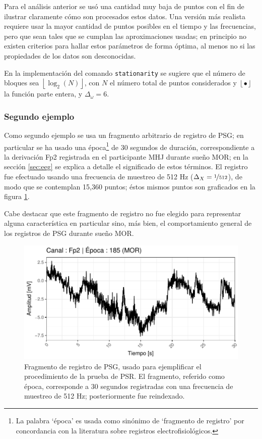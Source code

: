 \documentclass[12pt,letterpaper]{book}
\newcommand{\entero}[1]{\left\lfloor #1 \right\rfloor}
\begin{document}
Para el análisis anterior se usó una cantidad muy baja de puntos con el fin de ilustrar claramente cómo son procesados estos datos.
%
Una versión más realista requiere usar la mayor cantidad de puntos posibles en el tiempo y las frecuencias, pero que sean tales que se cumplan las aproximaciones usadas; en principio no existen criterios para hallar estos parámetros de forma óptima, al menos no si las propiedades de los datos son desconocidas.

En la implementación del comando \texttt{stationarity} se sugiere que el número de bloques sea $\entero{\log_2(N)}$, con $N$ el número total de puntos considerados y $\entero{\bullet}$ la función parte entera, y $\Delta_\omega=6$.


\subsubsection*{Segundo ejemplo}

Como segundo ejemplo se usa un fragmento arbitrario de registro de PSG; en particular se ha usado una época\footnote{La palabra `época' es usada como sinónimo de `fragmento de registro' por concordancia con la literatura sobre registros electrofisiológicos.} de 30 segundos de duración, correspondiente a la derivación Fp2 registrada en el participante MHJ durante sueño MOR; en la sección \ref{sec:eeg} se explica a detalle el significado de estos términos.
%
El registro fue efectuado usando una frecuencia de muestreo de 512 Hz ($\Delta_X =\nicefrac{1}{512}$), de modo que se contemplan 15,360 puntos; éstos mismos puntos son graficados en la figura \ref{fig:lazy22}.

Cabe destacar que este fragmento de registro no fue elegido para representar alguna característica en particular sino, más bien, el comportamiento general de los registros de PSG durante sueño MOR.

\begin{figure}
\centering
\includegraphics[width=.9\linewidth]{./scripts_graf_res/psg.pdf}
\caption[Fragmento de registro de PSG, usado para ejemplificar la prueba de PSR.]{Fragmento de registro de PSG, usado para ejemplificar el procedimiento de la prueba de PSR.
%
El fragmento, referido como época, corresponde a 30 segundos registradas con una frecuencia de muestreo de 512 Hz; posteriormente fue reindexado.}
\label{fig:lazy22}
\end{figure}
\end{document}
